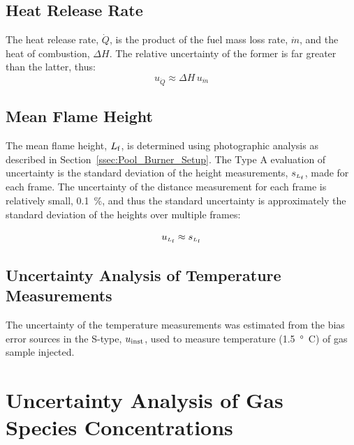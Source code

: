 \documentclass[12pt]{article}
\begin{document}
\subsection{Heat Release Rate}
\label{ssec:Heat_Release_Rate}

The heat release rate, $\dot{Q}$, is the product of the fuel mass loss rate, $\dot{m}$, and the heat of combustion, $\Delta H$. The relative uncertainty of the former is far greater than the latter, thus:
\begin{equation}
\label{eq:heat_release_rate_uncertainty}
u_{\scriptscriptstyle \dot{Q}} \approx \Delta H \, u_{\dot{m}}
\end{equation}

\subsection{Mean Flame Height}
\label{ssec:Mean_Flame_Height}

The mean flame height, ${L_{\rm{f}}}$, is determined using photographic analysis as described in Section~\ref{ssec:Pool_Burner_Setup}. The Type A evaluation of uncertainty is the standard deviation of the height measurements, $s_{\scriptscriptstyle L_{\rm{f}}}$, made for each frame. The uncertainty of the distance measurement for each frame is relatively small, 0.1~\%, and thus the standard uncertainty is approximately the standard deviation of the heights over multiple frames:

\begin{equation}
\label{eq:mean_flame_height}
u_{\scriptscriptstyle L_{\rm{f}}} \approx s_{\scriptscriptstyle{L_{\rm f}}}
\end{equation}


\subsection{Uncertainty Analysis of Temperature Measurements}
\label{sec:Uncertainty_Temperature_Measurements}
The uncertainty of the temperature measurements was estimated from the bias error sources in the S-type, $u_{\rm inst}$, used to measure temperature (\SI{1.5}{\degree C}) of gas sample injected.

\pagebreak

\section{Uncertainty Analysis of Gas Species Concentrations} \label{sec:UncertaintyGasSpecies}
\end{document}
